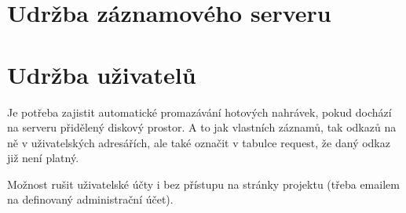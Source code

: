 
\section{Udržba záznamového serveru}
\section{Udržba uživatelů}

Je potřeba zajistit automatické promazávání hotových nahrávek, pokud dochází na serveru přidělený diskový prostor. A to jak vlastních záznamů, tak odkazů na ně v uživatelských adresářích, ale také označit v tabulce request, že daný odkaz již není platný.

\vspace{10pt}

Možnost rušit uživatelské účty i bez přístupu na stránky projektu (třeba emailem na definovaný administrační účet).

\vspace{10pt}


